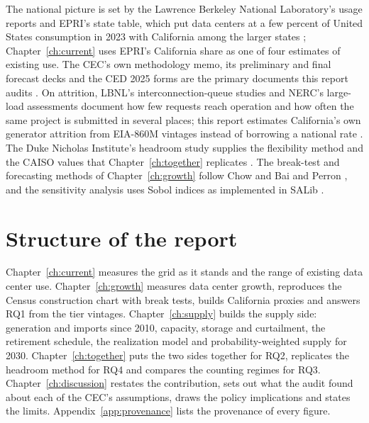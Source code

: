 The national picture is set by the Lawrence Berkeley National Laboratory's usage reports and EPRI's state table, which put data centers at a few percent of United States consumption in 2023 with California among the larger states \citep{epri2024}; Chapter~\ref{ch:current} uses EPRI's California share as one of four estimates of existing use. The CEC's own methodology memo, its preliminary and final forecast decks and the CED 2025 forms are the primary documents this report audits \citep{cec_dc_memo2026,cec_prelim2025,cec_tn272026,cec_ced2025}. On attrition, LBNL's interconnection-queue studies and NERC's large-load assessments document how few requests reach operation and how often the same project is submitted in several places; this report estimates California's own generator attrition from EIA-860M vintages instead of borrowing a national rate \citep{eia860m}. The Duke Nicholas Institute's headroom study supplies the flexibility method and the CAISO values that Chapter~\ref{ch:together} replicates \citep{duke2025}. The break-test and forecasting methods of Chapter~\ref{ch:growth} follow Chow and Bai and Perron \citep{chow1960,baiperron1998,baiperron2003}, and the sensitivity analysis uses Sobol indices as implemented in SALib \citep{sobol2001,salib2017}.

\section{Structure of the report}

Chapter~\ref{ch:current} measures the grid as it stands and the range of existing data center use. Chapter~\ref{ch:growth} measures data center growth, reproduces the Census construction chart with break tests, builds California proxies and answers RQ1 from the tier vintages. Chapter~\ref{ch:supply} builds the supply side: generation and imports since 2010, capacity, storage and curtailment, the retirement schedule, the realization model and probability-weighted supply for 2030. Chapter~\ref{ch:together} puts the two sides together for RQ2, replicates the headroom method for RQ4 and compares the counting regimes for RQ3. Chapter~\ref{ch:discussion} restates the contribution, sets out what the audit found about each of the CEC's assumptions, draws the policy implications and states the limits. Appendix~\ref{app:provenance} lists the provenance of every figure.
